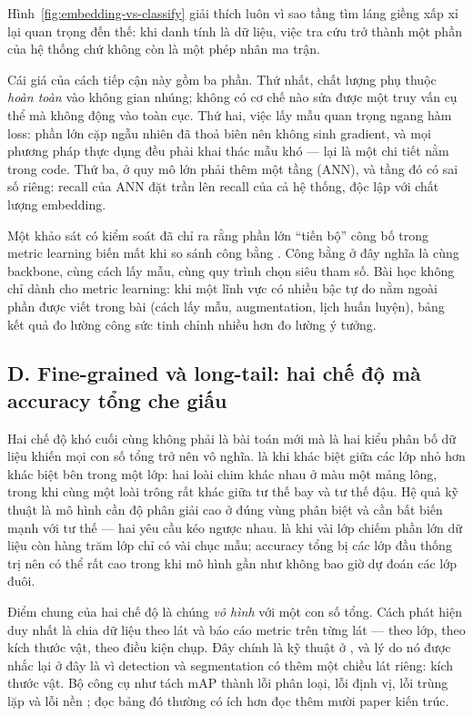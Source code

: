 \documentclass[../../../deep_learning.tex]{subfiles}
\begin{document}
Hình~\ref{fig:embedding-vs-classify} giải thích luôn vì sao tầng tìm láng giềng xấp xỉ lại quan trọng đến thế: khi danh tính là dữ liệu, việc tra cứu trở thành một phần của hệ thống chứ không còn là một phép nhân ma trận.

Cái giá của cách tiếp cận này gồm ba phần. Thứ nhất, chất lượng phụ thuộc \emph{hoàn toàn} vào không gian nhúng; không có cơ chế nào sửa được một truy vấn cụ thể mà không động vào toàn cục. Thứ hai, việc lấy mẫu quan trọng ngang hàm loss: phần lớn cặp ngẫu nhiên đã thoả biên nên không sinh gradient, và mọi phương pháp thực dụng đều phải khai thác mẫu khó --- lại là một chi tiết nằm trong code. Thứ ba, ở quy mô lớn phải thêm một tầng  (ANN), và tầng đó có sai số riêng: recall của ANN đặt trần lên recall của cả hệ thống, độc lập với chất lượng embedding.

\begin{cambay}
Một khảo sát có kiểm soát đã chỉ ra rằng phần lớn ``tiến bộ'' công bố trong metric learning biến mất khi so sánh công bằng \cite{musgrave2020metric}. Công bằng ở đây nghĩa là cùng backbone, cùng cách lấy mẫu, cùng quy trình chọn siêu tham số. Bài học không chỉ dành cho metric learning: khi một lĩnh vực có nhiều bậc tự do nằm ngoài phần được viết trong bài (cách lấy mẫu, augmentation, lịch huấn luyện), bảng kết quả đo lường công sức tinh chỉnh nhiều hơn đo lường ý tưởng.
\end{cambay}

\subsection{D. Fine-grained và long-tail: hai chế độ mà accuracy tổng che giấu}
Hai chế độ khó cuối cùng không phải là bài toán mới mà là hai kiểu phân bố dữ liệu khiến mọi con số tổng trở nên vô nghĩa.  là khi khác biệt giữa các lớp nhỏ hơn khác biệt bên trong một lớp: hai loài chim khác nhau ở màu một mảng lông, trong khi cùng một loài trông rất khác giữa tư thế bay và tư thế đậu. Hệ quả kỹ thuật là mô hình cần độ phân giải cao ở đúng vùng phân biệt và cần bất biến mạnh với tư thế --- hai yêu cầu kéo ngược nhau.  là khi vài lớp chiếm phần lớn dữ liệu còn hàng trăm lớp chỉ có vài chục mẫu; accuracy tổng bị các lớp đầu thống trị nên có thể rất cao trong khi mô hình gần như không bao giờ dự đoán các lớp đuôi.

Điểm chung của hai chế độ là chúng \emph{vô hình} với một con số tổng. Cách phát hiện duy nhất là chia dữ liệu theo lát và báo cáo metric trên từng lát --- theo lớp, theo kích thước vật, theo điều kiện chụp. Đây chính là kỹ thuật ở , và lý do nó được nhắc lại ở đây là vì detection và segmentation có thêm một chiều lát riêng: kích thước vật. Bộ công cụ như  tách mAP thành lỗi phân loại, lỗi định vị, lỗi trùng lặp và lỗi nền \cite{bolya2020tide, hoiem2012diagnosing}; đọc bảng đó thường có ích hơn đọc thêm mười paper kiến trúc.
\end{document}
